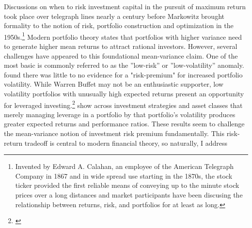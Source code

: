 \noindent Discussions on when to risk investment capital in the pursuit of maximum return took place over
telegraph lines nearly a century before Markowitz brought formality to the notion of risk, portfolio construction and optimization in the 1950s.\footnote{Invented by Edward A. Calahan, an employee of the American Telegraph Company in 1867 and in wide spread use starting in the 1870s, the stock ticker provided the first reliable means of conveying up to the minute stock prices over a long distances and market participants have been discusing the relationship between returns, risk, and portfolios for at least as long.\citep{rutterford_financial_2016}} %
Modern portfolio theory states that portfolios with higher variance need to generate higher mean returns to attract rational investors.\citep{markowitz_portfolio_1952} However, several challenges have appeared to this foundational mean-variance claim. One of the most basic is commonly referred to as the ”low-risk” or ”low-volatility” anomaly. \citet{haugen_1972} found there was little to no evidence for a "risk-premium" for increased portfolio volatility. While Warren Buffet may not be an enthusiastic supporter, low volatility portfolios
with unusually high expected returns present an opportunity for leveraged investing.\footnote{\citep{noauthor_warren_nodate}} \citet{moreira_volatility-managed_2017} show across investment strategies and asset classes that merely managing leverage in a portfolio by that portfolio's volatility produces greater expected returns and performance ratios.
These results seem to challenge the mean-variance notion of investment risk premium fundamentally. This risk-return tradeoff is central to modern financial theory, so naturally, I address
